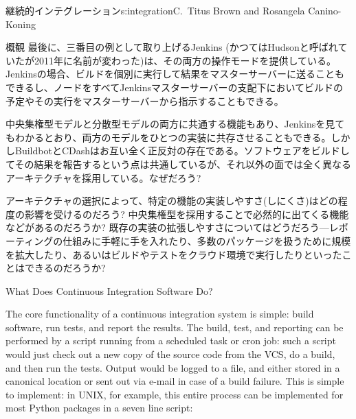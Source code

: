 \begin{aosachapter}{継続的インテグレーション}{s:integration}{C.\ Titus Brown and Rosangela Canino-Koning}
\begin{aosasect1}{概観}
最後に、三番目の例として取り上げるJenkins (かつてはHudsonと呼ばれていたが2011年に名前が変わった)は、その両方の操作モードを提供している。Jenkinsの場合、ビルドを個別に実行して結果をマスターサーバーに送ることもできるし、ノードをすべてJenkinsマスターサーバーの支配下においてビルドの予定やその実行をマスターサーバーから指示することもできる。

中央集権型モデルと分散型モデルの両方に共通する機能もあり、Jenkinsを見てもわかるとおり、両方のモデルをひとつの実装に共存させることもできる。しかしBuildbotとCDashはお互い全く正反対の存在である。ソフトウェアをビルドしてその結果を報告するという点は共通しているが、それ以外の面では全く異なるアーキテクチャを採用している。なぜだろう?

アーキテクチャの選択によって、特定の機能の実装しやすさ(しにくさ)はどの程度の影響を受けるのだろう? 中央集権型を採用することで必然的に出てくる機能などがあるのだろうか? 既存の実装の拡張しやすさについてはどうだろう---レポーティングの仕組みに手軽に手を入れたり、多数のパッケージを扱うために規模を拡大したり、あるいはビルドやテストをクラウド環境で実行したりといったことはできるのだろうか?

\begin{aosasect2}{What Does Continuous Integration Software Do?}

The core functionality of a continuous integration system is simple:
build software, run tests, and report the results. The build, test,
and reporting can be performed by a script running from a scheduled
task or cron job: such a script would just check out a new copy of the
source code from the VCS, do a build, and then run the tests. Output
would be logged to a file, and either stored in a canonical location
or sent out via e-mail in case of a build failure. This is simple to
implement: in UNIX, for example, this entire process can be
implemented for most Python packages in a seven line script:


\end{aosasect2}
\end{aosasect1}
\end{aosachapter}
